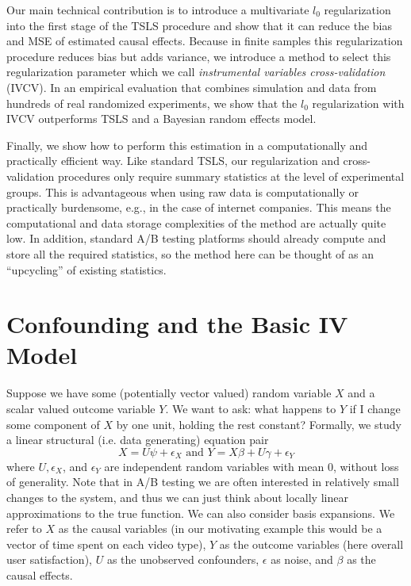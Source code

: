 \documentclass{article}
\begin{document}
Our main technical contribution is to introduce a multivariate $l_0$ regularization into the first stage of the TSLS procedure and show that it can reduce the bias and MSE of estimated causal effects. Because in finite samples this regularization procedure reduces bias but adds variance, we introduce a method to select this regularization parameter which we call \emph{instrumental variables cross-validation} (IVCV). In an empirical evaluation that combines simulation and data from hundreds of real randomized experiments, we show that the $l_0$ regularization with IVCV outperforms TSLS and a Bayesian random effects model.

Finally, we show how to perform this estimation in a computationally and practically efficient way. Like standard TSLS, our regularization and cross-validation procedures only require summary statistics at the level of experimental groups. This is advantageous when using raw data is computationally or practically burdensome, e.g., in the case of internet companies. This means the computational and data storage complexities of the method are actually quite low. In addition, standard A/B testing platforms \citep{bakshy2014www, xu2015infrastructure} should already compute and store all the required statistics, so the method here can be thought of as an ``upcycling'' of existing statistics.

\section{Confounding and the Basic IV Model}
Suppose we have some (potentially vector valued) random variable $X$ and a scalar valued outcome variable $Y$. We want to ask: what happens to $Y$ if I change some component of $X$ by one unit, holding the rest constant? Formally, we study a linear structural (i.e. data generating) equation pair
$$X = U\psi + \epsilon_{X} \text{ and } Y = X\beta + U\gamma + \epsilon_{Y}$$
where $U, \epsilon_X$, and $\epsilon_Y$ are independent random variables with mean 0, without loss of generality. Note that in A/B testing we are often interested in relatively small changes to the system, and thus we can just think about locally linear approximations to the true function. We can also consider basis expansions.
We refer to $X$ as the causal variables (in our motivating example this would be a vector of time spent on each video type), $Y$ as the outcome variables (here overall user satisfaction), $U$ as the unobserved confounders, $\epsilon$ as noise, and $\beta$ as the causal effects. 
\end{document}

